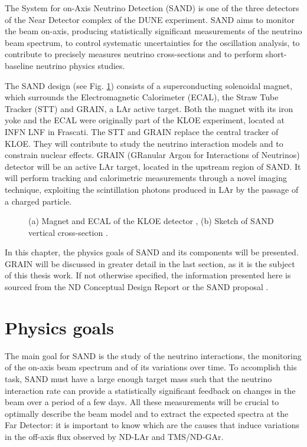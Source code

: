 The System for on-Axis Neutrino Detection (SAND) is one of the three detectors of the Near Detector complex of the DUNE experiment. 
SAND aims to monitor the beam on-axis, producing statistically significant measurements of the neutrino beam spectrum, to control systematic uncertainties for the oscillation analysis, to contribute to precisely measures neutrino cross-sections and to perform short-baseline neutrino physics studies.

The SAND design (see Fig. \ref{fig:sand}) consists of a superconducting solenoidal magnet, which surrounds the Electromagnetic Calorimeter (ECAL), the Straw Tube Tracker (STT) and GRAIN, a LAr active target. Both the magnet with its iron yoke and the ECAL were originally part of the KLOE experiment, located at INFN LNF in Frascati. The STT and GRAIN replace the central tracker of KLOE. They will contribute to study the neutrino interaction models and to constrain nuclear effects.
GRAIN (GRanular Argon for Interactions of Neutrinos) detector will be an active LAr target, located in the upstream region of SAND. It will perform tracking and calorimetric measurements through a novel imaging technique, exploiting the scintillation photons produced in LAr by the passage of a charged particle. 

\begin{figure}
    \centering
    \caption{(a) Magnet and ECAL of the KLOE detector \cite{tesi-cicero}, (b) Sketch of SAND vertical cross-section \cite{tesi-vicenzi}.}
    \label{fig:sand}
\end{figure}

In this chapter, the physics goals of SAND and its components will be presented. GRAIN will be discussed in greater detail in the last section, as it is the subject of this thesis work. If not otherwise specified, the  information presented here is sourced from the ND Conceptual Design Report \cite{nd_cdr} or the SAND proposal \cite{SAND-proposal}.

\section{Physics goals}
The main goal for SAND is the study of the neutrino interactions, the monitoring of the on-axis beam spectrum and of its variations over time. To accomplish this task, SAND must have a large enough target mass such that the neutrino interaction rate can provide a statistically significant feedback on changes in the beam over a period of a few days. All these measurements will be crucial to optimally describe the beam model and to extract the expected spectra at the Far Detector: it is important to know which are the causes that induce variations in the off-axis flux observed by ND-LAr and TMS/ND-GAr.

